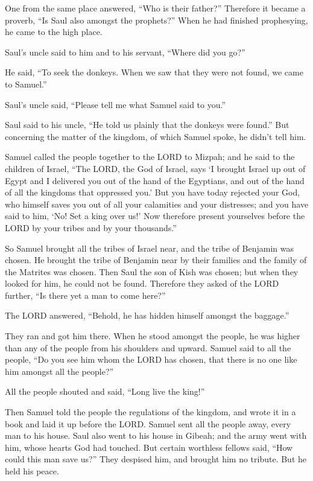  One from the same place answered, ``Who is their
father?'' Therefore it became a proverb, ``Is Saul also amongst the
prophets?''  When he had finished prophesying, he came to
the high place.

 Saul's uncle said to him and to his servant, ``Where did
you go?''

He said, ``To seek the donkeys. When we saw that they were not found, we
came to Samuel.''

 Saul's uncle said, ``Please tell me what Samuel said to
you.''

 Saul said to his uncle, ``He told us plainly that the
donkeys were found.'' But concerning the matter of the kingdom, of which
Samuel spoke, he didn't tell him.

 Samuel called the people together to the LORD to Mizpah;
 and he said to the children of Israel, ``The LORD, the
God of Israel, says `I brought Israel up out of Egypt and I delivered
you out of the hand of the Egyptians, and out of the hand of all the
kingdoms that oppressed you.'  But you have today
rejected your God, who himself saves you out of all your calamities and
your distresses; and you have said to him, `No! Set a king over us!' Now
therefore present yourselves before the LORD by your tribes and by your
thousands.''

 So Samuel brought all the tribes of Israel near, and the
tribe of Benjamin was chosen.  He brought the tribe of
Benjamin near by their families and the family of the Matrites was
chosen. Then Saul the son of Kish was chosen; but when they looked for
him, he could not be found.  Therefore they asked of the
LORD further, ``Is there yet a man to come here?''

The LORD answered, ``Behold, he has hidden himself amongst the
baggage.''

 They ran and got him there. When he stood amongst the
people, he was higher than any of the people from his shoulders and
upward.  Samuel said to all the people, ``Do you see him
whom the LORD has chosen, that there is no one like him amongst all the
people?''

All the people shouted and said, ``Long live the king!''

 Then Samuel told the people the regulations of the
kingdom, and wrote it in a book and laid it up before the LORD. Samuel
sent all the people away, every man to his house.  Saul
also went to his house in Gibeah; and the army went with him, whose
hearts God had touched.  But certain worthless fellows
said, ``How could this man save us?'' They despised him, and brought him
no tribute. But he held his peace.

